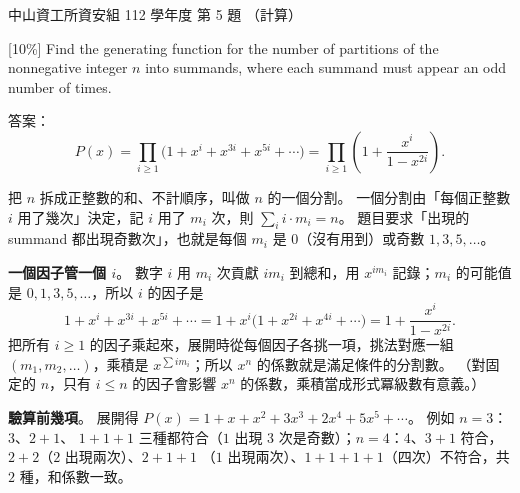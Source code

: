 \begin{pastexam}[label={px:nsysu-112-dmalg-05}]{中山資工所資安組 112 學年度 第 5 題}
（計算）

{[10\%]} Find the generating function for the number of partitions of the nonnegative integer $n$ into
summands, where each summand must appear an odd number of times.
\end{pastexam}

\begin{pastsoln}
答案：
\[
P(x) = \prod_{i \ge 1} \bigl(1 + x^{i} + x^{3i} + x^{5i} + \cdots\bigr)
     = \prod_{i \ge 1} \left(1 + \frac{x^{i}}{1 - x^{2i}}\right).
\]

把 $n$ 拆成正整數的和、不計順序，叫做 $n$ 的一個分割。 一個分割由「每個正整數 $i$ 用了幾次」決定，記
$i$ 用了 $m_i$ 次，則 $\sum_i i \cdot m_i = n$。 題目要求「出現的 summand 都出現奇數次」，也就是每個 $m_i$
是 $0$（沒有用到）或奇數 $1, 3, 5, \ldots$。

\textbf{一個因子管一個 $i$}。 數字 $i$ 用 $m_i$ 次貢獻 $i m_i$ 到總和，用 $x^{i m_i}$ 記錄；$m_i$ 的可能值是
$0, 1, 3, 5, \ldots$，所以 $i$ 的因子是
\[
1 + x^{i} + x^{3i} + x^{5i} + \cdots = 1 + x^{i}\bigl(1 + x^{2i} + x^{4i} + \cdots\bigr) = 1 + \frac{x^i}{1 - x^{2i}}.
\]
把所有 $i \ge 1$ 的因子乘起來，展開時從每個因子各挑一項，挑法對應一組 $(m_1, m_2, \ldots)$，乘積是
$x^{\sum i m_i}$；所以 $x^n$ 的係數就是滿足條件的分割數。 （對固定的 $n$，只有 $i \le n$ 的因子會影響 $x^n$
的係數，乘積當成形式冪級數有意義。）

\textbf{驗算前幾項}。 展開得 $P(x) = 1 + x + x^2 + 3x^3 + 2x^4 + 5x^5 + \cdots$。 例如 $n = 3$：$3$、$2 + 1$、
$1 + 1 + 1$ 三種都符合（$1$ 出現 $3$ 次是奇數）；$n = 4$：$4$、$3 + 1$ 符合，$2 + 2$（$2$ 出現兩次）、$2 + 1 + 1$
（$1$ 出現兩次）、$1 + 1 + 1 + 1$（四次）不符合，共 $2$ 種，和係數一致。
\end{pastsoln}
